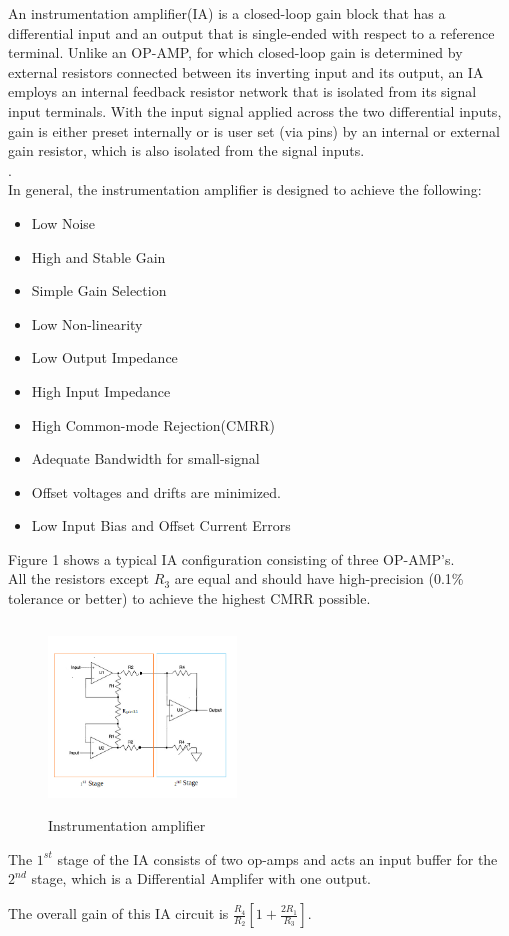 \documentclass[]{article}
\begin{document}
		An instrumentation amplifier(IA) is a closed-loop gain block that has a differential input and an output that is single-ended with respect to a reference terminal. Unlike an OP-AMP, for which closed-loop gain is determined by external resistors connected between its
		inverting input and its output, an IA employs an internal feedback resistor network that is isolated from its signal input terminals. With the input signal applied across
		the two differential inputs, gain is either preset internally
		or is user set (via pins) by an internal or external gain
		resistor, which is also isolated from the signal inputs.\\
		\vspace{.1cm}\cite{kitchin2006}.\\
	   {{In general, the instrumentation amplifier is designed to achieve the following:}}\cite{sciencedirect}
		\begin{itemize}
			\item Low Noise
			\item High and Stable Gain	
			\item Simple Gain Selection	
			\item Low Non-linearity
			\item Low Output Impedance 
			\item High Input Impedance 
			\item High Common-mode Rejection(CMRR)
			\item Adequate Bandwidth for small-signal
			\item Offset voltages and drifts are minimized.
			\item Low Input Bias and Offset Current Errors
			
		\end{itemize}
	
		Figure 1 shows a typical IA configuration consisting of three OP-AMP's.\\All the resistors except $R_3$ are equal and  should have high-precision (0.1\% tolerance or better) to achieve the highest CMRR possible. \\

\begin{figure}[H]
	\centering
	\includegraphics[width=5cm, height=5cm]{IA_DIAGRAM}
	\caption[Figure 1: ]{Instrumentation amplifier}
	\label{fig:IA-CIRCUIT-DIAGRAM}
\end{figure}
	The $1^{st}$ stage of the IA consists of two op-amps and acts an input buffer for the $2^{nd}$ stage, which is a Differential Amplifer with one output.
	\begin{center}The overall gain of this IA circuit is $\frac{R_4}{R_2}\left[1 + \frac{2R_1}{R_3}\right]$.\\\end{center}
	
\end{document}
